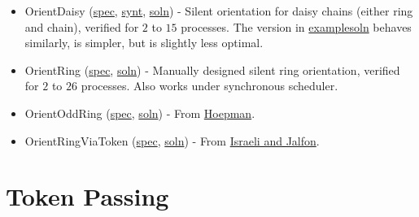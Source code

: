 \begin{itemize}
\item OrientDaisy (\href{\examplespec/OrientDaisy.prot}{spec}, \href{\examplesoln/OrientDaisy.prot}{synt}, \href{\examplesoln/OrientDaisy.prot}{soln})
- Silent orientation for daisy chains (either ring and chain), verified for $2$ to $15$ processes.
The version in \href{\examplesoln}{examplesoln} behaves similarly, is simpler, but is slightly less optimal.
\item OrientRing (\href{\examplespec/OrientRing.prot}{spec}, \href{\examplespec/OrientRing.prot}{soln})
- Manually designed silent ring orientation, verified for $2$ to $26$ processes.
Also works under synchronous scheduler.
\item OrientOddRing (\href{\examplespec/OrientOddRing.prot}{spec}, \href{\examplesoln/OrientOddRing.prot}{soln})
- From \href{http://dx.doi.org/10.1007/BFb0020439}{Hoepman}.
\item OrientRingViaToken (\href{\examplespec/OrientRingViaToken.prot}{spec}, \href{\examplesoln/OrientRingViaToken.prot}{soln})
- From \href{http://dx.doi.org/10.1006/inco.1993.1029}{Israeli and Jalfon}.
\end{itemize}

\section{Token Passing}

